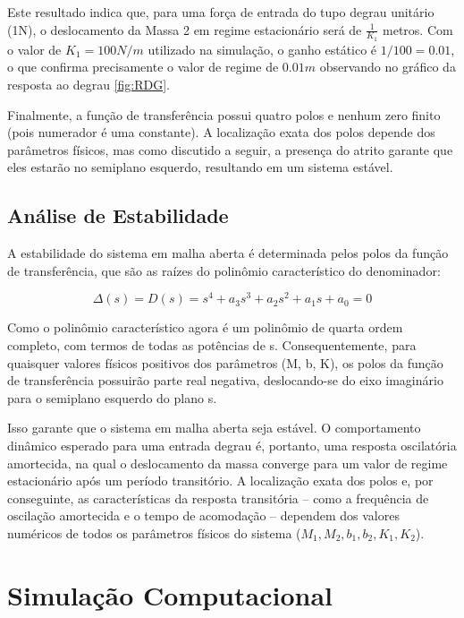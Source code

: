 \documentclass[9pt,a4paper,twocolumn,twoside]{tau-class/tau}
\begin{document}
Este resultado indica que, para uma força de entrada do tupo degrau unitário (1N), o deslocamento da Massa 2 em regime estacionário será de $\frac{1}{K_1}$ metros. Com o valor de $K_1 = 100 N/m$ utilizado na simulação, o ganho estático é $1/100 = 0.01$, o que confirma precisamente o valor de regime de $0.01 m$ observando no gráfico da resposta ao degrau \ref{fig:RDG}.

Finalmente, a função de transferência possui quatro polos e nenhum zero finito (pois numerador é uma constante). A localização exata dos polos depende dos parâmetros físicos, mas como discutido a seguir, a presença do atrito garante que eles estarão no semiplano esquerdo, resultando em um sistema estável.

\subsection{Análise de Estabilidade}

A estabilidade do sistema em malha aberta é determinada pelos polos da função de transferência, que são as raízes do polinômio característico do denominador:

\begin{equation}
    \Delta (s) = D(s) = s^4 + a_3s^3 + a_2s^2 + a_1s + a_0 = 0
\label{eq:raizes}
\end{equation}

Como o polinômio característico agora é um polinômio de quarta ordem completo, com termos de todas as potências de s. Consequentemente, para quaisquer valores físicos positivos dos parâmetros (M, b, K), os polos da função de transferência possuirão parte real negativa, deslocando-se do eixo imaginário para o semiplano esquerdo do plano s.

Isso garante que o sistema em malha aberta seja estável. O comportamento dinâmico esperado para uma entrada degrau é, portanto, uma resposta oscilatória amortecida, na qual o deslocamento da massa converge para um valor de regime estacionário após um período transitório. A localização exata dos polos e, por conseguinte, as características da resposta transitória -- como a frequência de oscilação amortecida e o tempo de acomodação -- dependem dos valores numéricos de todos os parâmetros físicos do sistema ($M_1, M_2, b_1, b_2, K_1, K_2$).

\section{Simulação Computacional}
\end{document}
